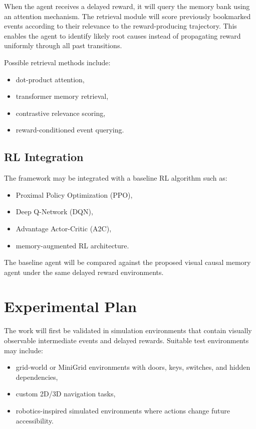\documentclass[12pt,a4paper]{article}
\begin{document}
When the agent receives a delayed reward, it will query the memory bank using an attention mechanism. The retrieval module will score previously bookmarked events according to their relevance to the reward-producing trajectory. This enables the agent to identify likely root causes instead of propagating reward uniformly through all past transitions.

Possible retrieval methods include:
\begin{itemize}
    \item dot-product attention,
    \item transformer memory retrieval,
    \item contrastive relevance scoring,
    \item reward-conditioned event querying.
\end{itemize}

\subsection{RL Integration}

The framework may be integrated with a baseline RL algorithm such as:
\begin{itemize}
    \item Proximal Policy Optimization (PPO),
    \item Deep Q-Network (DQN),
    \item Advantage Actor-Critic (A2C),
    \item memory-augmented RL architecture.
\end{itemize}

The baseline agent will be compared against the proposed visual causal memory agent under the same delayed reward environments.

\section{Experimental Plan}

The work will first be validated in simulation environments that contain visually observable intermediate events and delayed rewards. Suitable test environments may include:

\begin{itemize}
    \item grid-world or MiniGrid environments with doors, keys, switches, and hidden dependencies,
    \item custom 2D/3D navigation tasks,
    \item robotics-inspired simulated environments where actions change future accessibility.
\end{itemize}
\end{document}
